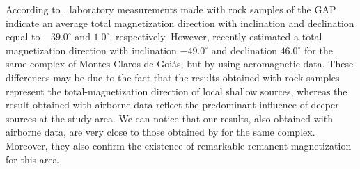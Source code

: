 According to \citet{marangoni_mantovani_2013}, laboratory measurements made with 
rock samples of the GAP indicate an average total magnetization direction 
with inclination and declination equal to $-39.0^\circ$ and $1.0^\circ$, 
respectively.
However, \citet{zhang_etal_2018} recently estimated a total magnetization direction 
with inclination $-49.0^\circ$ and declination 
$46.0^\circ$ for the same complex of Montes Claros de Goi\'as, but by using 
aeromagnetic data. 
These differences may be due to the fact that the results obtained with 
rock samples represent the total-magnetization direction of local shallow sources,
whereas the result obtained with airborne data reflect the predominant influence of 
deeper sources at the study area. 
We can notice that our results, also obtained with airborne data, are very close to 
those obtained by \citet{zhang_etal_2018} for the same complex. Moreover, 
they also confirm the existence of remarkable remanent magnetization for this area. 


